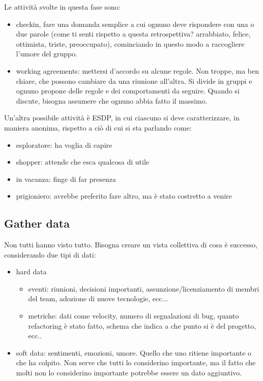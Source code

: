 \noindent Le attività svolte in questa fase sono:

\begin{itemize}
    \item checkin, fare una domanda semplice a cui ognuno deve rispondere con una o due parole (come ti senti rispetto a questa retrospettiva? arrabbiato, felice, ottimista, triste, preoccupato), cominciando in questo modo a raccogliere l'umore del gruppo.
    \item working agreements: mettersi d'accordo su alcune regole. Non troppe, ma ben chiare, che possono cambiare da una riunione all'altra. Si divide in gruppi e ognuno propone delle regole e dei comportamenti da seguire. Quando si discute, bisogna assumere che ognuno abbia fatto il massimo. 
\end{itemize}

\noindent Un'altra possibile attività è ESDP, in cui ciascuno si deve caratterizzare, in maniera anonima, rispetto a ciò di cui si sta parlando come:

\begin{itemize}
    \item esploratore: ha voglia di capire
    \item shopper: attende che esca qualcosa di utile
    \item in vacanza: finge di far presenza
    \item prigioniero: avrebbe preferito fare altro, ma è stato costretto a venire
\end{itemize}

\subsection{Gather data}

Non tutti hanno visto tutto. Bisogna creare un vista collettiva di cosa è successo, considerando due tipi di dati:
\begin{itemize}
    \item hard data
        \begin{itemize}
            \item eventi: riunioni, decisioni importanti, assunzione/licenziamento di membri del team, adozione di nuove tecnologie, ecc...
            \item metriche: dati come velocity, numero di segnalazioni di bug, quanto refactoring è stato fatto, schema che indica a che punto si è del progetto, ecc..
        \end{itemize}
    \item soft data: sentimenti, emozioni, umore. Quello che uno ritiene importante o che ha colpito. Non serve che tutti lo considerino importante, ma il fatto che molti non lo considerino importante potrebbe essere un dato aggiuntivo. 
\end{itemize}

